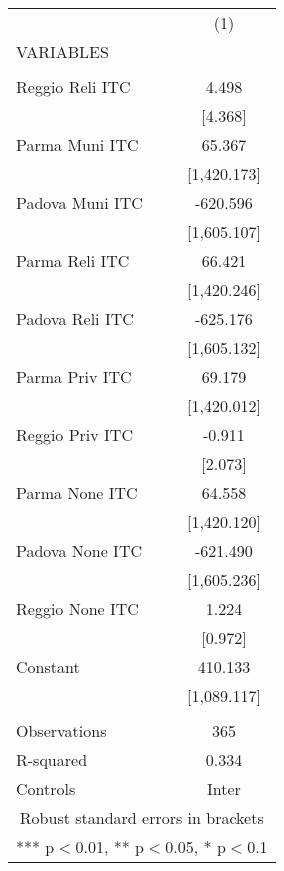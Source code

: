 \begin{tabular}{lc} \hline
 & (1) \\
VARIABLES &  \\ \hline
 &  \\
Reggio Reli ITC & 4.498 \\
 & [4.368] \\
Parma Muni ITC & 65.367 \\
 & [1,420.173] \\
Padova Muni ITC & -620.596 \\
 & [1,605.107] \\
Parma Reli ITC & 66.421 \\
 & [1,420.246] \\
Padova Reli ITC & -625.176 \\
 & [1,605.132] \\
Parma Priv ITC & 69.179 \\
 & [1,420.012] \\
Reggio Priv ITC & -0.911 \\
 & [2.073] \\
Parma None ITC & 64.558 \\
 & [1,420.120] \\
Padova None ITC & -621.490 \\
 & [1,605.236] \\
Reggio None ITC & 1.224 \\
 & [0.972] \\
Constant & 410.133 \\
 & [1,089.117] \\
 &  \\
Observations & 365 \\
R-squared & 0.334 \\
 Controls & Inter \\ \hline
\multicolumn{2}{c}{ Robust standard errors in brackets} \\
\multicolumn{2}{c}{ *** p$<$0.01, ** p$<$0.05, * p$<$0.1} \\
\end{tabular}
